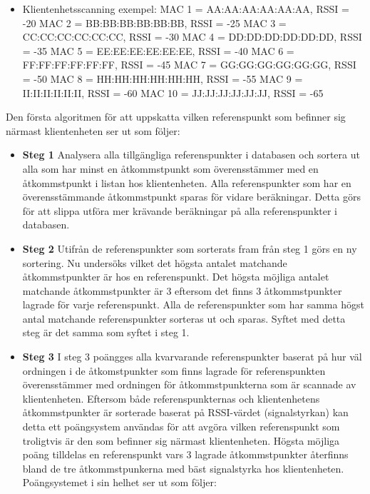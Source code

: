 \documentclass[swedish, a4paper,12pt]{article}
\begin{document}
\begin{itemize}
{\begin{itemize}
  \item Klientenhetsscanning exempel:
        \newline MAC 1 = AA:AA:AA:AA:AA:AA,  RSSI = -20
        \newline MAC 2 = BB:BB:BB:BB:BB:BB,  RSSI = -25
        \newline MAC 3 = CC:CC:CC:CC:CC:CC,  RSSI = -30
        \newline MAC 4 = DD:DD:DD:DD:DD:DD,  RSSI = -35
        \newline MAC 5 = EE:EE:EE:EE:EE:EE,  RSSI = -40
        \newline MAC 6 = FF:FF:FF:FF:FF:FF,  RSSI = -45
        \newline MAC 7 = GG:GG:GG:GG:GG:GG,  RSSI = -50
        \newline MAC 8 = HH:HH:HH:HH:HH:HH,  RSSI = -55
        \newline MAC 9 = II:II:II:II:II:II,  RSSI = -60
        \newline MAC 10 = JJ:JJ:JJ:JJ:JJ:JJ,  RSSI = -65
\end{itemize}

Den första algoritmen för att uppskatta vilken referenspunkt som befinner sig närmast klientenheten ser ut som följer:

  \begin{itemize}
    \item \textbf{Steg 1}
    \newline
    Analysera alla tillgängliga referenspunkter i databasen och sortera ut alla som har minst en åtkommstpunkt som överensstämmer med en åtkommstpunkt i listan hos klientenheten. Alla referenspunkter som har en överensstämmande åtkommstpunkt sparas för vidare beräkningar. Detta görs för att slippa utföra mer krävande beräkningar på alla referenspunkter i databasen.
    \item \textbf{Steg 2}
    \newline
    Utifrån de referenspunkter som sorterats fram från steg 1 görs en ny sortering. Nu undersöks vilket det högsta antalet matchande åtkommstpunkter är hos en referenspunkt. Det högsta möjliga antalet matchande åtkommstpunkter är 3 eftersom det finns 3 åtkommstpunkter lagrade för varje referenspunkt. Alla de referenspunkter som har samma högst antal matchande referenspunkter sorteras ut och sparas. Syftet med detta steg är det samma som syftet i steg 1.
    \item \textbf{Steg 3}
    \newline
    I steg 3 poängges alla kvarvarande referenspunkter baserat på hur väl ordningen i de åtkomstpunkter som finns lagrade för referenspunkten överensstämmer med ordningen för åtkommstpunkterna som är scannade av klientenheten. Eftersom både referenspunkternas och klientenhetens åtkommstpunkter är sorterade baserat på RSSI-värdet (signalstyrkan) kan detta ett poängsystem användas för att avgöra vilken referenspunkt som troligtvis är den som befinner sig närmast klientenheten.
    Högsta möjliga poäng tilldelas en referenspunkt vars 3 lagrade åtkommstpunkter återfinns bland de tre åtkommstpunkerna med bäst signalstyrka hos klientenheten.
    Poängsystemet i sin helhet ser ut som följer:


\end{itemize}}
\end{itemize}
\end{document}

